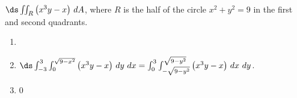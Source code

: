 {$\ds \iint_R \big(x^3y-x\big)\ dA$, where $R$ is the half of the circle $x^2+y^2=9$ in the first and second quadrants.
}
{\begin{enumerate}
\item \noindent \begin{minipage}{.9\linewidth}
\end{minipage}
\item	$\ds \int_{-3}^3\int_{0}^{\sqrt{9-x^2}}\big(x^3y-x\big)\ dy\ dx = \int_{0}^3\int_{-\sqrt{9-y^2}}^{\sqrt{9-y^2}}\big(x^3y-x\big)\ dx\ dy$.
\item 0
\end{enumerate}
}